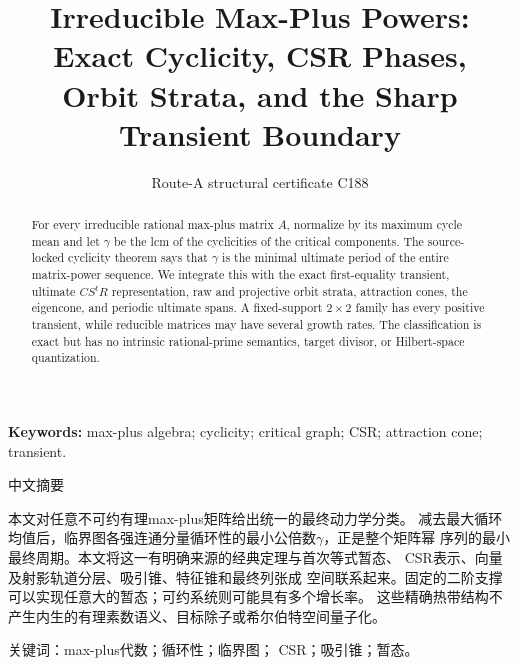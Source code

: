 \documentclass[9pt]{extarticle}
\title{Irreducible Max-Plus Powers: Exact Cyclicity, CSR Phases,\\
Orbit Strata, and the Sharp Transient Boundary}
\author{Route-A structural certificate C188}
\date{}
\begin{document}
\maketitle
\begin{abstract}
For every irreducible rational max-plus matrix $A$, normalize by its maximum
cycle mean and let $\gamma$ be the lcm of the cyclicities of the critical
components.  The source-locked cyclicity theorem says that $\gamma$ is the
minimal ultimate period of the entire matrix-power sequence.  We integrate
this with the exact first-equality transient, ultimate $CS^tR$ representation,
raw and projective orbit strata, attraction cones, the eigencone, and periodic
ultimate spans.  A fixed-support $2\times2$ family has every positive transient,
while reducible matrices may have several growth rates.  The classification is
exact but has no intrinsic rational-prime semantics, target divisor, or
Hilbert-space quantization.
\end{abstract}
\noindent\textbf{Keywords:} max-plus algebra; cyclicity; critical graph; CSR;
attraction cone; transient.

\begin{otherlanguage}{chinese-simplified}
\begin{center}{\large 中文摘要}\end{center}
本文对任意不可约有理\foreignlanguage{english}{max-plus}矩阵给出统一的最终动力学分类。
减去最大循环均值后，临界图各强连通分量循环性的最小公倍数$\gamma$，正是整个矩阵幂
序列的最小最终周期。本文将这一有明确来源的经典定理与首次等式暂态、
\foreignlanguage{english}{CSR}表示、向量及射影轨道分层、吸引锥、特征锥和最终列张成
空间联系起来。固定的二阶支撑可以实现任意大的暂态；可约系统则可能具有多个增长率。
这些精确热带结构不产生内生的有理素数语义、目标除子或希尔伯特空间量子化。

\noindent 关键词：\foreignlanguage{english}{max-plus}代数；循环性；临界图；
\foreignlanguage{english}{CSR}；吸引锥；暂态。
\end{otherlanguage}
\end{document}
